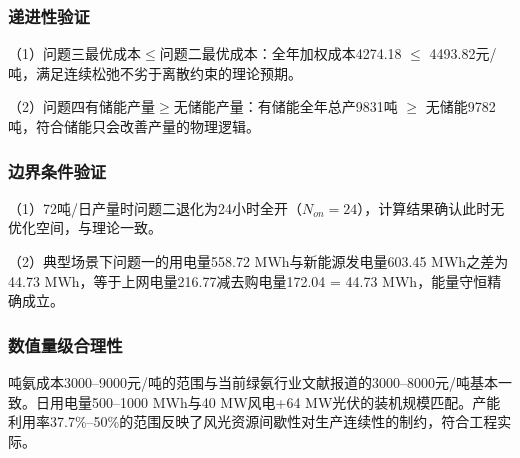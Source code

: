 \subsubsection{递进性验证}

（1）问题三最优成本$\leq$问题二最优成本：全年加权成本4274.18 $\leq$ 4493.82元/吨，满足连续松弛不劣于离散约束的理论预期。

（2）问题四有储能产量$\geq$无储能产量：有储能全年总产9831吨 $\geq$ 无储能9782吨，符合储能只会改善产量的物理逻辑。

\subsubsection{边界条件验证}

（1）72吨/日产量时问题二退化为24小时全开（$N_{on} = 24$），计算结果确认此时无优化空间，与理论一致。

（2）典型场景下问题一的用电量558.72 MWh与新能源发电量603.45 MWh之差为44.73 MWh，等于上网电量216.77减去购电量172.04 = 44.73 MWh，能量守恒精确成立。

\subsubsection{数值量级合理性}

吨氨成本3000--9000元/吨的范围与当前绿氨行业文献报道的3000--8000元/吨基本一致。日用电量500--1000 MWh与40 MW风电+64 MW光伏的装机规模匹配。产能利用率37.7\%--50\%的范围反映了风光资源间歇性对生产连续性的制约，符合工程实际。
